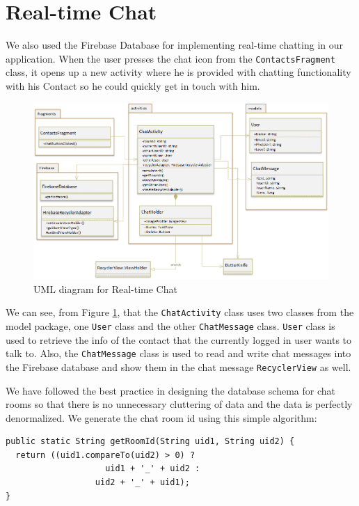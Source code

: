 \section{Real-time Chat}
We also used the Firebase Database for implementing real-time chatting in our application. When the user presses the chat icon from the \texttt{ContactsFragment} class, it opens up a new activity where he is provided with chatting functionality with his Contact so he could quickly get in touch with him.


\begin{figure}
    \centering
        \includegraphics[width=1.00\textwidth]{images/uml-chat.png}
    \caption{UML diagram for Real-time Chat}
    \label{fig:uml-chat}
\end{figure}


We can see, from Figure \ref{fig:uml-chat}, that the \texttt{ChatActivity} class uses two classes from the model package, one \texttt{User} class and the other \texttt{ChatMessage} class. \texttt{User} class is used to retrieve the info of the contact that the currently logged in user wants to talk to. Also, the \texttt{ChatMessage} class is used to read and write chat messages into the Firebase database and show them in the chat message \texttt{RecyclerView} as well.

We have followed the best practice in designing the database schema for chat rooms so that there is no unnecessary cluttering of data and the data is perfectly denormalized. We generate the chat room id using this simple algorithm: 

\begin{verbatim}
public static String getRoomId(String uid1, String uid2) {
  return ((uid1.compareTo(uid2) > 0) ? 
                    uid1 + '_' + uid2 : 
                  uid2 + '_' + uid1);
}
\end{verbatim}

